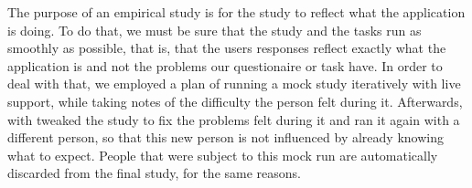 The purpose of an empirical study is for the study to reflect what the application is doing. To do that, we must be sure that the study and the tasks run as smoothly as possible, that is, that the users responses reflect exactly what the application is and not the problems our questionaire or task have. In order to deal with that, we employed a plan of running a mock study iteratively with live support, while taking notes of the difficulty the person felt during it. Afterwards, with tweaked the study to fix the problems felt during it and ran it again with a different person, so that this new person is not influenced by already knowing what to expect. People that were subject to this mock run are automatically discarded from the final study, for the same reasons.
